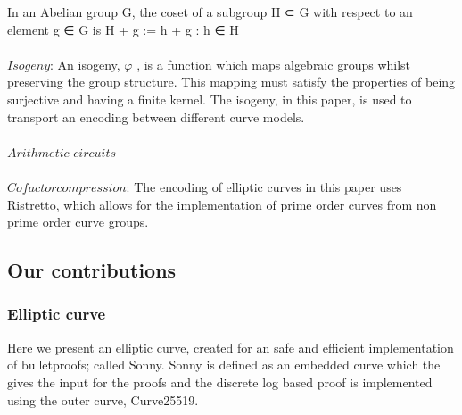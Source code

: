 \documentclass{article}
\begin{document}
In an Abelian group G, the coset of a subgroup H ⊂ G with respect to
an element g ∈ G is H + g := {h + g : h ∈ H}\\\\
$Isogeny$: An isogeny, $\varphi$ , is a function which maps algebraic groups whilst preserving the group structure. This mapping must satisfy the properties of being surjective and having a finite kernel. The isogeny, in this paper, is used to transport an encoding between different curve models.\\\\
$Arithmetic$ $circuits$\\\\
$Cofactor compression$: The encoding of elliptic curves in this paper uses Ristretto, which allows for the implementation of prime order curves from non prime order curve groups.

\subsection{Our contributions}
\subsubsection{Elliptic curve}
Here we present an elliptic curve, created for an safe and efficient implementation of bulletproofs; called Sonny. Sonny is defined as an embedded curve which the gives the input for the proofs and the discrete log based proof is implemented using the outer curve, Curve25519. \\\\
\end{document}
